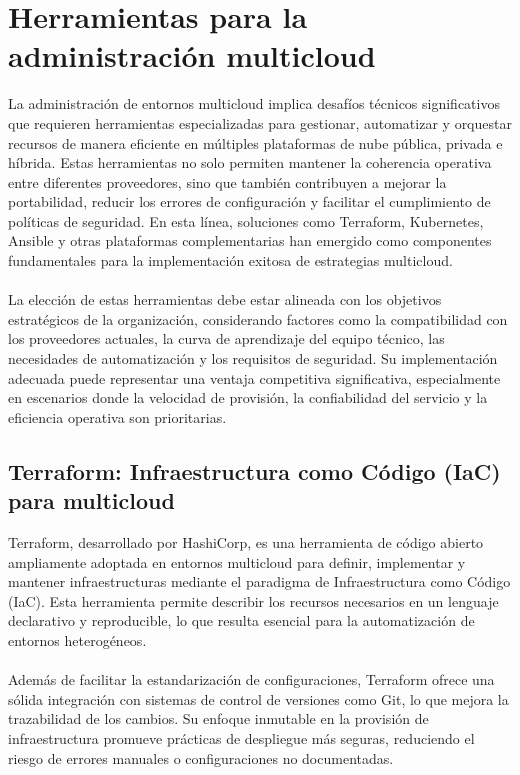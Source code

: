 {    \section{Herramientas para la administración multicloud}
        La administración de entornos multicloud implica desafíos técnicos significativos que requieren herramientas especializadas para gestionar, automatizar y orquestar recursos de manera eficiente en múltiples plataformas de nube pública, privada e híbrida. Estas herramientas no solo permiten mantener la coherencia operativa entre diferentes proveedores, sino que también contribuyen a mejorar la portabilidad, reducir los errores de configuración y facilitar el cumplimiento de políticas de seguridad. En esta línea, soluciones como Terraform, Kubernetes, Ansible y otras plataformas complementarias han emergido como componentes fundamentales para la implementación exitosa de estrategias multicloud.
            
        \paragraph{}La elección de estas herramientas debe estar alineada con los objetivos estratégicos de la organización, considerando factores como la compatibilidad con los proveedores actuales, la curva de aprendizaje del equipo técnico, las necesidades de automatización y los requisitos de seguridad. Su implementación adecuada puede representar una ventaja competitiva significativa, especialmente en escenarios donde la velocidad de provisión, la confiabilidad del servicio y la eficiencia operativa son prioritarias.
            
        \subsection{Terraform: Infraestructura como Código (IaC) para multicloud}
            Terraform, desarrollado por HashiCorp, es una herramienta de código abierto ampliamente adoptada en entornos multicloud para definir, implementar y mantener infraestructuras mediante el paradigma de Infraestructura como Código (IaC). Esta herramienta permite describir los recursos necesarios en un lenguaje declarativo y reproducible, lo que resulta esencial para la automatización de entornos heterogéneos.
            
            \paragraph{}Además de facilitar la estandarización de configuraciones, Terraform ofrece una sólida integración con sistemas de control de versiones como Git, lo que mejora la trazabilidad de los cambios. Su enfoque inmutable en la provisión de infraestructura promueve prácticas de despliegue más seguras, reduciendo el riesgo de errores manuales o configuraciones no documentadas.
            
}

